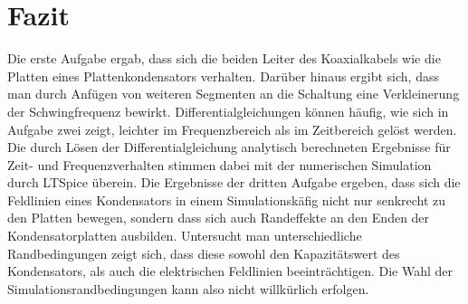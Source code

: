 \chapter{Fazit}\label{sec:fazit}
Die erste Aufgabe ergab, dass sich die beiden Leiter des Koaxialkabels wie die Platten eines Plattenkondensators verhalten. Darüber hinaus ergibt sich, dass man durch Anfügen von weiteren Segmenten an die Schaltung eine Verkleinerung der Schwingfrequenz bewirkt.
Differentialgleichungen können häufig, wie sich in Aufgabe zwei zeigt, leichter im Frequenzbereich als im Zeitbereich gelöst werden. Die durch Lösen der Differentialgleichung analytisch berechneten Ergebnisse für Zeit- und Frequenzverhalten stimmen dabei mit der numerischen Simulation durch LTSpice überein.
Die Ergebnisse der dritten Aufgabe ergeben, dass sich die Feldlinien eines Kondensators in einem Simulationskäfig nicht nur senkrecht zu den Platten bewegen, sondern dass sich auch Randeffekte an den Enden der Kondensatorplatten ausbilden. Untersucht man unterschiedliche Randbedingungen zeigt sich, dass diese sowohl den Kapazitätswert des Kondensators, als auch die elektrischen Feldlinien beeinträchtigen. Die Wahl der Simulationsrandbedingungen kann also nicht willkürlich erfolgen.
